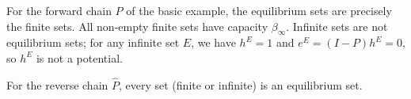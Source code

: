 For the forward chain $P$ of the basic example, the equilibrium sets are precisely the finite sets. All non-empty finite sets have capacity $\beta_\infty$. Infinite sets are not equilibrium sets; for any infinite set $E$, we have $h^E = 1$ and $e^E = (I-P)h^E = 0$, so $h^E$ is not a potential.

For the reverse chain $\hat{P}$, every set (finite or infinite) is an equilibrium set.
